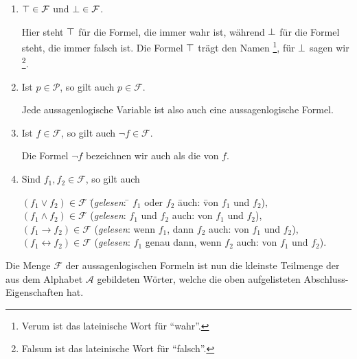 \begin{enumerate}
\item $\top \in \mathcal{F}$ und $\bot \in \mathcal{F}$.

      Hier steht $\top$   für die Formel, die immer wahr ist, während $\bot$
        für die 
      Formel steht, die immer falsch ist.  Die Formel $\top$ trägt den Namen
      \footnote{Verum ist das lateinische Wort für ``wahr''.},  für $\bot$ sagen wir  
      \footnote{Falsum ist das lateinische Wort für ``falsch''.}.
\item Ist $p \in \mathcal{P}$, so gilt auch $p \in \mathcal{F}$.

      Jede aussagenlogische Variable ist also auch eine aussagenlogische Formel.
\item Ist $f \in \mathcal{F}$, so gilt auch $\neg f \in \mathcal{F}$.

      Die Formel $\neg f$  bezeichnen wir auch als die  von $f$.
\item Sind $f_1, f_2 \in \mathcal{F}$, so gilt auch
      \begin{tabbing}
        $(f_1 \vee f_2) \in \mathcal{F}$  \hspace*{0.5cm} \= (\textsl{gelesen}: \quad \= $f_1$ oder $f_2$ \hspace*{2.5cm} \=
         auch: \quad\= von $f_1$ und $f_2$), \\
        $(f_1 \wedge f_2) \in \mathcal{F}$  \> (\textsl{gelesen}: \> $f_1$ und $f_2$ \>
         auch: \> von $f_1$ und $f_2$), \\
        $(f_1 \rightarrow f_2) \in \mathcal{F}$  \> (\textsl{gelesen}:       \> wenn $f_1$, dann $f_2$ \>
         auch: \> von $f_1$ und $f_2$), \\
        $(f_1 \leftrightarrow f_2) \in \mathcal{F}$  \> (\textsl{gelesen}:       \> $f_1$ genau dann, wenn $f_2$ \>
         auch: \> von $f_1$ und $f_2$).            
      \end{tabbing}
\end{enumerate}
Die Menge $\mathcal{F}$ der aussagenlogischen Formeln ist nun die kleinste Teilmenge der aus dem Alphabet $\mathcal{A}$
gebildeten Wörter, welche die oben aufgelisteten Abschluss-Eigenschaften hat.

